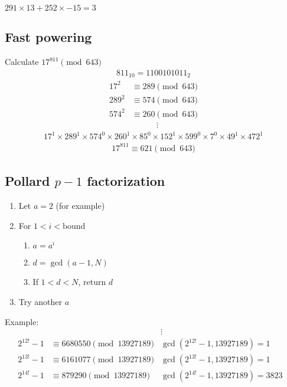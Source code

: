 \documentclass{article}
\begin{document}
$291 \times 13 + 252 \times -15 = 3$

\subsection*{Fast powering}
Calculate $17^{811} \pmod{643}$
\begin{align*}
    811_{10} = 1100101011_2
\end{align*}
\begin{align*}
    17^2 &\equiv 289 \pmod{643} \\
    289^2 &\equiv 574 \pmod{643} \\
    574^2 &\equiv 260 \pmod{643} \\
    & \qquad \quad \vdots
\end{align*}
\begin{align*}
    17^{1} \times 289^{1} \times 574^{0} \times 260^{1} \times 85^{0} \times 152^{1} \times 599^{0} \times 7^{0} \times 49^{1} \times 472^{1}
\end{align*}
\begin{align*}
    17^{811} \equiv 621 \pmod{643}
\end{align*}

\subsection*{Pollard $p-1$ factorization}
\begin{enumerate}
    \item Let $a = 2$ (for example)
    \item For $1 < i < \text{bound}$
    \begin{enumerate}
        \item $a = a^i$
        \item $d = \gcd(a - 1, N)$
        \item If $1 < d < N$, return $d$
    \end{enumerate}
    \item Try another $a$
\end{enumerate}

Example:
\begin{align*}
    & &\vdots & \\
    2^{12!} - 1 &\equiv 6680550 \pmod{13927189} & \gcd(2^{12!} - 1, 13927189) = 1 \\
    2^{13!} - 1 &\equiv 6161077 \pmod{13927189} & \gcd(2^{13!} - 1, 13927189) = 1 \\
    2^{14!} - 1 &\equiv 879290  \pmod{13927189} & \gcd(2^{14!} - 1, 13927189) = 3823 \\
\end{align*}
\end{document}
